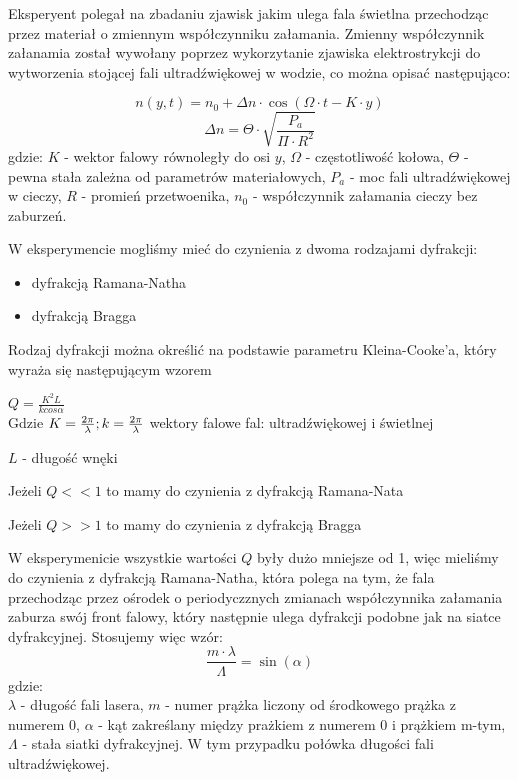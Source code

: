 \documentclass[a4paper,12pt]{article}
\begin{document}


Eksperyent polegał na zbadaniu zjawisk jakim ulega fala świetlna przechodząc przez materiał o zmiennym współczynniku załamania. Zmienny współczynnik załanamia został wywołany poprzez wykorzytanie zjawiska elektrostrykcji do wytworzenia stojącej fali ultradźwiękowej w wodzie, co można opisać następująco: 

$$ n(y,t) = n_0+\Delta n \cdot \cos (\Omega\cdot  t-K\cdot y) $$ 
$$ \Delta n = \Theta \cdot \sqrt{\frac{P_a}{\Pi \cdot R^2}}   $$
gdzie: \newline
$K$ - wektor falowy równoległy do osi $y$, 
$\Omega$ - częstotliwość kołowa,  
$\Theta$ - pewna stała zależna od parametrów materiałowych, 
$P_a$ - moc fali ultradźwiękowej w cieczy,
$R$ - promień przetwoenika,
$n_0$ - współczynnik załamania cieczy bez zaburzeń.

W eksperymencie mogliśmy mieć do czynienia z dwoma rodzajami dyfrakcji:
\begin{itemize}
\item dyfrakcją Ramana-Natha
\item dyfrakcją Bragga
\end{itemize}

Rodzaj dyfrakcji można określić na podstawie parametru Kleina-Cooke'a, który wyraża się następującym wzorem

\(
Q = \frac{K^2  L}{k cos \alpha }
\)
\\
Gdzie
\(
K = \frac{2 \pi}{ \lambda }; \\ k = \frac{2 \pi}{\lambda}
\) wektory falowe fal: ultradźwiękowej i świetlnej

\( L  \) - długość wnęki

Jeżeli \( Q << 1\) to mamy do czynienia z dyfrakcją Ramana-Nata

Jeżeli \( Q >> 1 \) to mamy do czynienia z dyfrakcją Bragga

W eksperymenicie wszystkie wartości $Q$ były dużo mniejsze od 1, więc mieliśmy do czynienia z dyfrakcją Ramana-Natha, która polega na tym, że fala przechodząc przez ośrodek o periodyczznych zmianach współczynnika załamania zaburza swój front falowy, który następnie ulega dyfrakcji podobne jak na siatce dyfrakcyjnej. Stosujemy więc wzór: 
$$ \frac{m \cdot \lambda}{\Lambda}=\sin (\alpha) $$
gdzie: \\
$\lambda$ - długość fali lasera, 
$m$ - numer prążka liczony od środkowego prążka z numerem 0, 
$ \alpha $ - kąt zakreślany między prażkiem z numerem 0 i prążkiem m-tym,
$ \Lambda $ - stała siatki dyfrakcyjnej. W tym przypadku połówka długości fali ultradźwiękowej. \\
\end{document}
